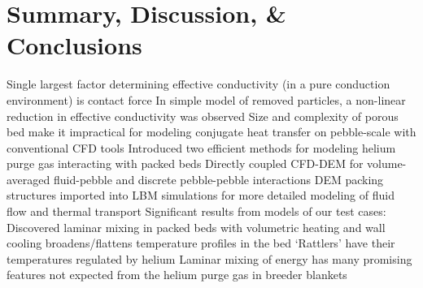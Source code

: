 \section{Summary, Discussion, \& Conclusions}
Single largest factor determining effective conductivity (in a pure conduction environment) is contact force
In simple model of removed particles, a non-linear reduction in effective conductivity was observed
Size and complexity of porous bed make it impractical for modeling conjugate heat transfer on pebble-scale with conventional CFD tools
Introduced two efficient methods for modeling helium purge gas interacting with packed beds
Directly coupled CFD-DEM for volume-averaged fluid-pebble and discrete pebble-pebble interactions
DEM packing structures imported into LBM simulations for more detailed modeling of fluid flow and thermal transport
Significant results from models of our test cases:
Discovered laminar mixing in packed beds with volumetric heating and wall cooling broadens/flattens temperature profiles in the bed 
‘Rattlers’ have their temperatures regulated by helium
Laminar mixing of energy has many promising features not expected from the helium purge gas in breeder blankets

